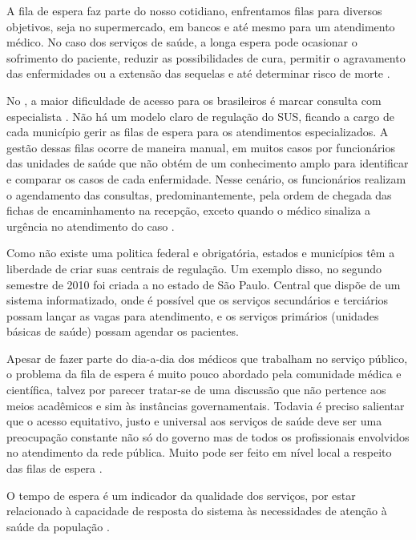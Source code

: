 A fila de espera faz parte do nosso cotidiano, enfrentamos filas para diversos objetivos, seja no supermercado, em bancos e até mesmo para um atendimento médico. No caso dos serviços de saúde, a longa espera pode ocasionar o sofrimento do paciente, reduzir as possibilidades de cura, permitir o agravamento das enfermidades ou a extensão das sequelas e até determinar risco de morte \cite{Gazzinelli2014}. 

No , a maior dificuldade de acesso para os brasileiros é marcar consulta com especialista \cite{CFM2018}. Não há um modelo claro de regulação do SUS, ficando a cargo de cada município gerir as filas de espera para os atendimentos especializados. A gestão dessas filas ocorre de maneira manual, em muitos casos por funcionários das unidades de saúde que não obtém de um conhecimento amplo para identificar e comparar os casos de cada enfermidade. Nesse cenário, os funcionários realizam o agendamento das consultas, predominantemente, pela ordem de chegada das fichas de encaminhamento na recepção, exceto quando o médico sinaliza a urgência no atendimento do caso \cite{SOUZA2014}.

Como não existe uma politica federal e obrigatória, estados e municípios têm a liberdade de criar suas centrais de regulação. Um exemplo disso, no segundo semestre de 2010 foi criada a  no estado de São Paulo. Central que dispõe de um sistema informatizado, onde é possível que os serviços secundários e terciários possam lançar as vagas para atendimento, e os serviços primários (unidades básicas de saúde) possam agendar os pacientes.

Apesar de fazer parte do dia-a-dia dos médicos que trabalham no serviço público, o problema da fila de espera é muito pouco abordado pela comunidade médica e científica, talvez por parecer tratar-se de uma discussão que não pertence aos meios acadêmicos e sim às instâncias governamentais. Todavia é preciso salientar que o acesso equitativo, justo e universal aos serviços de saúde deve ser uma preocupação constante não só do governo mas de todos os profissionais envolvidos no atendimento da rede pública. Muito pode ser feito em nível local a respeito das filas de espera \cite{KRISHNAMURTI2005}.

O tempo de espera é um indicador da qualidade dos serviços, por estar relacionado à capacidade de resposta do sistema às necessidades de atenção à saúde da população \cite{Gazzinelli2014}. 
    
